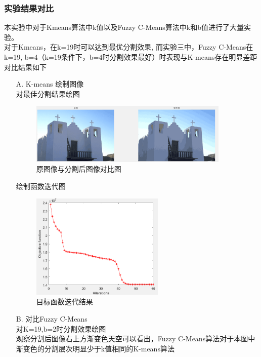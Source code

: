 \documentclass{article}
\begin{document}
\subsubsection{实验结果对比}
本实验中对于Kmeans算法中k值以及Fuzzy C-Means算法中k和b值进行了大量实验。\\
对于Kmeans，在k=19时可以达到最优分割效果,
而实验三中，Fuzzy C-Means在 k=19, b=4（k=19条件下，b=4时分割效果最好）时表现与K-means存在明显差距\\
对比结果如下
\begin{itemize}

\item[A.]K-means
绘制图像\\
 对最佳分割结果绘图
 
    \begin{figure}[H]
        \centering
        \includegraphics[width=0.9\textwidth]{img/K19.png} 
        \caption{原图像与分割后图像对比图}
        \label{fig.5}
    \end{figure}
   绘制函数迭代图
\begin{figure}[H]
	\centering
	\includegraphics[width=0.6\textwidth]{img/funK19.png} 
	\caption{目标函数迭代结果}
	\label{fig.6}
\end{figure}   
\item[B.]对比Fuzzy C-Means\\
对K=19,b=2时分割效果绘图\\
观察分割后图像右上方渐变色天空可以看出，Fuzzy C-Means算法对于本图中渐变色的分割层次明显少于k值相同的K-means算法
 

\end{itemize}
\end{document}
